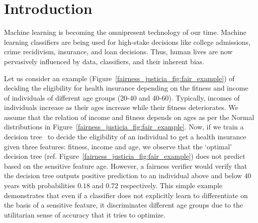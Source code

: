 \section{Introduction}
Machine learning is becoming the omnipresent technology of our time. Machine learning classifiers are being used for high-stake decisions like college admissions, crime recidivism, insurance, and loan decisions. Thus, human lives are now pervasively influenced by data, classifiers, and their inherent bias.

\begin{example}\label{fairness_justicia_example:intro}
Let us consider an example (Figure~\ref{fairness_justicia_fig:fair_example}) of deciding the eligibility for health insurance depending on the fitness and income of individuals of different age groups (20-40 and 40-60). Typically, incomes of individuals increase as their ages increase while their fitness deteriorates. We assume that the relation of income and fitness depends on ages as per the Normal distributions in Figure~\ref{fairness_justicia_fig:fair_example}. Now, if we train a decision tree~\cite{narodytska2018learning} to decide the eligibility of an individual to get a health insurance given three features: fitness, income and age, we observe that the `optimal' decision tree (ref. Figure~\ref{fairness_justicia_fig:fair_example}) does not predict based on the sensitive feature age. However, a fairness verifier would verify that the decision tree outputs positive prediction to an individual above and below $40$ years with probabilities $0.18$ and $0.72$ respectively. This simple example demonstrates that even if a classifier does not explicitly learn to differentiate on the basis of a sensitive feature, it discriminates different age groups due to the utilitarian sense of accuracy that it tries to optimize.
\end{example}

